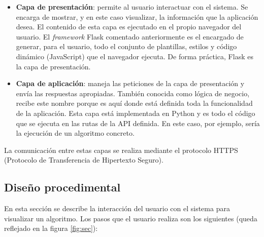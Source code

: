 
\begin{itemize}
    \item \textbf{Capa de presentación}: permite al usuario interactuar con el sistema. Se encarga de mostrar, y en este caso visualizar, la información que la aplicación desea. El contenido de esta capa es ejecutado en el propio navegador del usuario. El \textit{framework} Flask comentado anteriormente es el encargado de generar, para el usuario, todo el conjunto de plantillas, estilos y código dinámico (JavaScript) que el navegador ejecuta. De forma práctica, Flask es la capa de presentación.
    \item \textbf{Capa de aplicación}: maneja las peticiones de la capa de presentación y envía las respuestas apropiadas. También conocida como lógica de negocio, recibe este nombre porque es aquí donde está definida toda la funcionalidad de la aplicación. Esta capa está implementada en Python y es todo el código que se ejecuta en las rutas de la API definida. En este caso, por ejemplo, sería la ejecución de un algoritmo concreto.
\end{itemize}

La comunicación entre estas capas se realiza mediante el protocolo HTTPS (Protocolo de Transferencia de Hipertexto Seguro).


\subsection{Diseño procedimental}

En esta sección se describe la interacción del usuario con el sistema para visualizar un algoritmo. Los pasos que el usuario realiza son los siguientes (queda reflejado en la figura \ref{fig:sec}):

